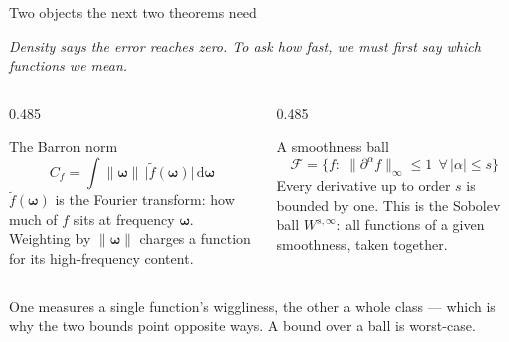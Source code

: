 \documentclass[aspectratio=169, 11pt]{beamer}
\newcommand{\bridge}[1]{%
  {\scriptsize\itshape\color{mcMuted} #1\par}\vspace{0.35em}}
\newcommand{\src}[3]{}      %
\begin{document}
\begin{frame}{Two objects the next two theorems need}
  \src{barron1993}{section}{III}
  \src{devore1989}{section}{4}
  \vspace{-0.05em}
  \bridge{Density says the error reaches zero. To ask \emph{how fast},
  we must first say which functions we mean.}
  \begin{columns}[T, onlytextwidth]
    \begin{column}{0.485\textwidth}
      \begin{block}{The Barron norm}
        {\scriptsize
        \[ C_f=\int \lVert\bm\omega\rVert\,
           \big|\tilde f(\bm\omega)\big|\,\mathrm{d}\bm\omega \]
        $\tilde f(\bm\omega)$ is the Fourier transform: how much of $f$
        sits at frequency $\bm\omega$. Weighting by
        $\lVert\bm\omega\rVert$ \alert{charges a function for its
        high-frequency content}.}
      \end{block}

    \end{column}
    \hfill
    \begin{column}{0.485\textwidth}
      \begin{block}{A smoothness ball}
        {\scriptsize
        \[ \mathcal{F}=\big\{f:\ \lVert \partial^{\alpha}f
           \rVert_\infty\leq 1 \ \ \forall\,|\alpha|\leq s\big\} \]
        Every derivative up to order $s$ is bounded by one. This is the
        Sobolev ball $W^{s,\infty}$: \alert{all functions of a given
        smoothness, taken together}.}
      \end{block}

    \end{column}
  \end{columns}
  \vspace{-0.1em}
  \begin{redhighlight}
    {\footnotesize One measures a \alert{single} function's
    wiggliness, the other a \alert{whole class} --- which is why the two
    bounds point opposite ways. A bound over a ball is worst-case.}
  \end{redhighlight}
\end{frame}
\end{document}
